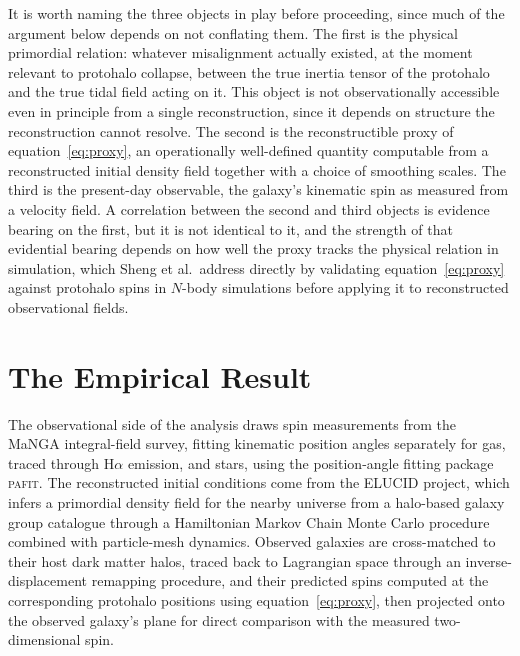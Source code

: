 \documentclass[11pt]{article}
\begin{document}
It is worth naming the three objects in play before proceeding, since much of the argument below depends on not conflating them. The first is the physical primordial relation: whatever misalignment actually existed, at the moment relevant to protohalo collapse, between the true inertia tensor of the protohalo and the true tidal field acting on it. This object is not observationally accessible even in principle from a single reconstruction, since it depends on structure the reconstruction cannot resolve. The second is the reconstructible proxy of equation~\eqref{eq:proxy}, an operationally well-defined quantity computable from a reconstructed initial density field together with a choice of smoothing scales. The third is the present-day observable, the galaxy's kinematic spin as measured from a velocity field. A correlation between the second and third objects is evidence bearing on the first, but it is not identical to it, and the strength of that evidential bearing depends on how well the proxy tracks the physical relation in simulation, which Sheng et al.\ address directly by validating equation~\eqref{eq:proxy} against protohalo spins in $N$-body simulations before applying it to reconstructed observational fields.

\section{The Empirical Result}

The observational side of the analysis draws spin measurements from the MaNGA integral-field survey, fitting kinematic position angles separately for gas, traced through H$\alpha$ emission, and stars, using the position-angle fitting package \textsc{pafit}. The reconstructed initial conditions come from the ELUCID project, which infers a primordial density field for the nearby universe from a halo-based galaxy group catalogue through a Hamiltonian Markov Chain Monte Carlo procedure combined with particle-mesh dynamics. Observed galaxies are cross-matched to their host dark matter halos, traced back to Lagrangian space through an inverse-displacement remapping procedure, and their predicted spins computed at the corresponding protohalo positions using equation~\eqref{eq:proxy}, then projected onto the observed galaxy's plane for direct comparison with the measured two-dimensional spin.
\end{document}
